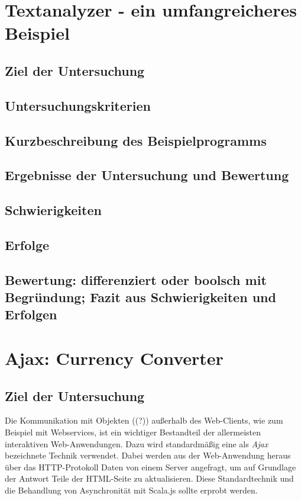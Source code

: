 \documentclass[a4paper, 12pt, hidelinks, listof=totoc, listoftables=totoc, bibliography=totoc]{scrreprt}
\begin{document}
\section{Textanalyzer - ein umfangreicheres Beispiel}


\subsection{Ziel der Untersuchung}
\subsection{Untersuchungskriterien}
\subsection{Kurzbeschreibung des Beispielprogramms}
\subsection{Ergebnisse der Untersuchung und Bewertung}
\subsection{Schwierigkeiten}
\subsection{Erfolge}
\subsection{Bewertung: differenziert oder boolsch mit Begründung; Fazit aus Schwierigkeiten und Erfolgen}



\section{Ajax: Currency Converter}


\subsection{Ziel der Untersuchung}

Die Kommunikation mit Objekten ((?)) außerhalb des Web-Clients, wie zum Beispiel mit Webservices, ist ein wichtiger Bestandteil der allermeisten interaktiven Web-Anwendungen. Dazu wird standardmäßig eine als \textit{Ajax} bezeichnete Technik verwendet. Dabei werden aus der Web-Anwendung heraus über das HTTP-Protokoll Daten von einem Server angefragt, um auf Grundlage der Antwort Teile der HTML-Seite zu aktualisieren. Diese Standardtechnik und die Behandlung von Asynchronität mit Scala.js sollte erprobt werden.
\end{document}
